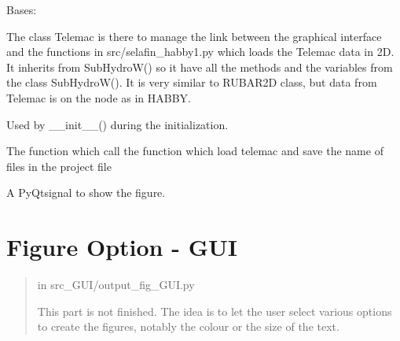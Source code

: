 \documentclass[letterpaper,10pt,english]{sphinxmanual}
\begin{document}

\begin{fulllineitems}
\label{\detokenize{index:src_GUI.hydro_GUI_2.TELEMAC}}
Bases: {\hyperref[\detokenize{index:src_GUI.hydro_GUI_2.SubHydroW}]{}}

The class Telemac is there to manage the link between the graphical interface and the functions in src/selafin\_habby1.py
which loads the Telemac data in 2D. It inherits from SubHydroW() so it have all the methods and the variables
from the class SubHydroW(). It is very similar to RUBAR2D class, but data from Telemac is on the node as in HABBY.

\begin{fulllineitems}
\label{\detokenize{index:src_GUI.hydro_GUI_2.TELEMAC.init_iu}}
Used by \_\_init\_\_() during the initialization.

\end{fulllineitems}


\begin{fulllineitems}
\label{\detokenize{index:src_GUI.hydro_GUI_2.TELEMAC.load_telemac_gui}}
The function which call the function which load telemac and save the name of files in the project file

\end{fulllineitems}


\begin{fulllineitems}
\label{\detokenize{index:src_GUI.hydro_GUI_2.TELEMAC.show_fig}}
A PyQtsignal to show the figure.

\end{fulllineitems}


\end{fulllineitems}



\section{Figure Option - GUI}
\label{\detokenize{index:figure-option-gui}}\begin{quote}

in src\_GUI/output\_fig\_GUI.py

This part is not finished. The idea is to let the user select various options to create
the figures, notably the colour or the size of the text.
\end{quote}
\label{\detokenize{index:module-src_GUI.output_fig_GUI}}
\end{document}
